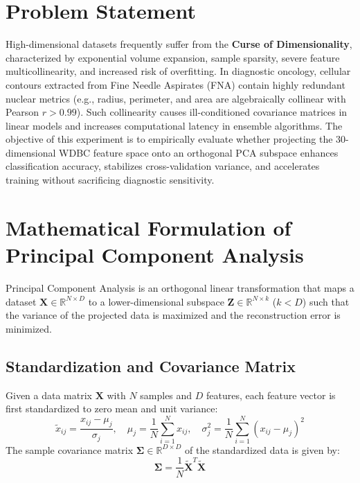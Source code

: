 \documentclass[12pt,a4paper]{article}
\begin{document}
\section{Problem Statement}
High-dimensional datasets frequently suffer from the \textbf{Curse of Dimensionality}, characterized by exponential volume expansion, sample sparsity, severe feature multicollinearity, and increased risk of overfitting. In diagnostic oncology, cellular contours extracted from Fine Needle Aspirates (FNA) contain highly redundant nuclear metrics (e.g., radius, perimeter, and area are algebraically collinear with Pearson $r > 0.99$). Such collinearity causes ill-conditioned covariance matrices in linear models and increases computational latency in ensemble algorithms. The objective of this experiment is to empirically evaluate whether projecting the 30-dimensional WDBC feature space onto an orthogonal PCA subspace enhances classification accuracy, stabilizes cross-validation variance, and accelerates training without sacrificing diagnostic sensitivity.

\section{Mathematical Formulation of Principal Component Analysis}
Principal Component Analysis is an orthogonal linear transformation that maps a dataset $\mathbf{X} \in \mathbb{R}^{N \times D}$ to a lower-dimensional subspace $\mathbf{Z} \in \mathbb{R}^{N \times k}$ ($k < D$) such that the variance of the projected data is maximized and the reconstruction error is minimized.

\subsection{Standardization and Covariance Matrix}
Given a data matrix $\mathbf{X}$ with $N$ samples and $D$ features, each feature vector is first standardized to zero mean and unit variance:
\begin{equation}
\tilde{x}_{ij} = \frac{x_{ij} - \mu_j}{\sigma_j}, \quad \mu_j = \frac{1}{N}\sum_{i=1}^N x_{ij}, \quad \sigma_j^2 = \frac{1}{N}\sum_{i=1}^N (x_{ij} - \mu_j)^2
\end{equation}
The sample covariance matrix $\mathbf{\Sigma} \in \mathbb{R}^{D \times D}$ of the standardized data is given by:
\begin{equation}
\mathbf{\Sigma} = \frac{1}{N} \mathbf{\tilde{X}}^T \mathbf{\tilde{X}}
\end{equation}
\end{document}
